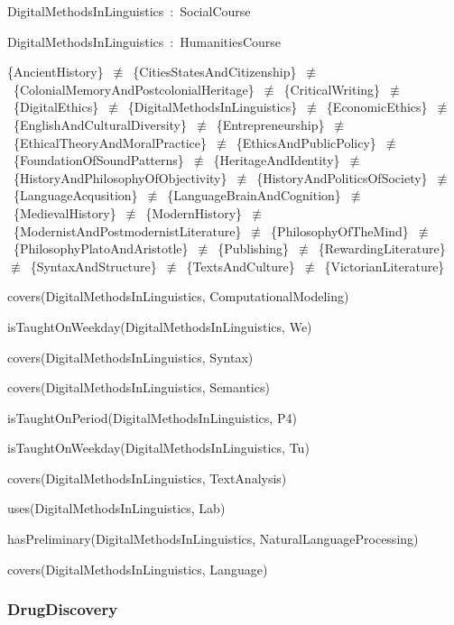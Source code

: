 \documentclass{article}
\begin{document}
DigitalMethodsInLinguistics~:~SocialCourse

DigitalMethodsInLinguistics~:~HumanitiesCourse

\{AncientHistory\}~\ensuremath{\not\equiv}~\{CitiesStatesAndCitizenship\}~\ensuremath{\not\equiv}~\{ColonialMemoryAndPostcolonialHeritage\}~\ensuremath{\not\equiv}~\{CriticalWriting\}~\ensuremath{\not\equiv}~\{DigitalEthics\}~\ensuremath{\not\equiv}~\{DigitalMethodsInLinguistics\}~\ensuremath{\not\equiv}~\{EconomicEthics\}~\ensuremath{\not\equiv}~\{EnglishAndCulturalDiversity\}~\ensuremath{\not\equiv}~\{Entrepreneurship\}~\ensuremath{\not\equiv}~\{EthicalTheoryAndMoralPractice\}~\ensuremath{\not\equiv}~\{EthicsAndPublicPolicy\}~\ensuremath{\not\equiv}~\{FoundationOfSoundPatterns\}~\ensuremath{\not\equiv}~\{HeritageAndIdentity\}~\ensuremath{\not\equiv}~\{HistoryAndPhilosophyOfObjectivity\}~\ensuremath{\not\equiv}~\{HistoryAndPoliticsOfSociety\}~\ensuremath{\not\equiv}~\{LanguageAcqusition\}~\ensuremath{\not\equiv}~\{LanguageBrainAndCognition\}~\ensuremath{\not\equiv}~\{MedievalHistory\}~\ensuremath{\not\equiv}~\{ModernHistory\}~\ensuremath{\not\equiv}~\{ModernistAndPostmodernistLiterature\}~\ensuremath{\not\equiv}~\{PhilosophyOfTheMind\}~\ensuremath{\not\equiv}~\{PhilosophyPlatoAndAristotle\}~\ensuremath{\not\equiv}~\{Publishing\}~\ensuremath{\not\equiv}~\{RewardingLiterature\}~\ensuremath{\not\equiv}~\{SyntaxAndStructure\}~\ensuremath{\not\equiv}~\{TextsAndCulture\}~\ensuremath{\not\equiv}~\{VictorianLiterature\}

covers(DigitalMethodsInLinguistics, ComputationalModeling)

isTaughtOnWeekday(DigitalMethodsInLinguistics, We)

covers(DigitalMethodsInLinguistics, Syntax)

covers(DigitalMethodsInLinguistics, Semantics)

isTaughtOnPeriod(DigitalMethodsInLinguistics, P4)

isTaughtOnWeekday(DigitalMethodsInLinguistics, Tu)

covers(DigitalMethodsInLinguistics, TextAnalysis)

uses(DigitalMethodsInLinguistics, Lab)

hasPreliminary(DigitalMethodsInLinguistics, NaturalLanguageProcessing)

covers(DigitalMethodsInLinguistics, Language)

\subsubsection*{DrugDiscovery}
\end{document}

